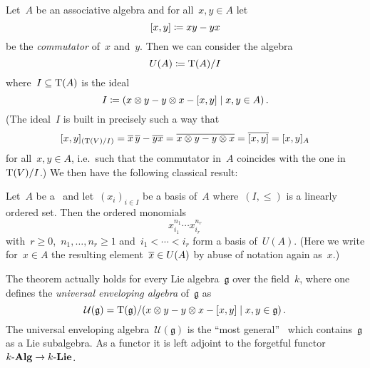 Let~$A$ be an associative algebra and for all~$x, y \in A$ let
\[
            [x,y]
  \coloneqq  xy - yx
\]
be the \emph{commutator} of~$x$ and~$y$.
Then we can consider the algebra
\[
            U(A)
  \coloneqq  \operatorname{T}(A)/I
\]
where~$I \subseteq \operatorname{T}(A)$ is the {\twosided} ideal
\[
            I
  \defined  \genideal{
              x \tensor y - y \tensor x - [x,y]
              \suchthat
              x, y \in A
            } \,.
\]
(The ideal~$I$ is built in precisely such a way that
\[
    [x, y]_{(\operatorname{T}(V)/I)}
  = \overline{x} \, \overline{y} - \overline{y} \overline{x}
  = \overline{x \otimes y - y \otimes x}
  = \overline{[x,y]}
  = [x,y]_A
\]
for all~$x, y \in A$, i.e.\ such that the commutator in~$A$ coincides with the one in~$\operatorname{T}(V)/I$.)
We then have the following classical result:

\begin{theorem}[{\pbw}]
  Let~$A$ be a~{\kalg} and let~$(x_i)_{i \in I}$ be a basis of~$A$ where~$(I, \leq)$ is a linearly ordered set.
  Then the ordered monomials
  \[
    x_{i_1}^{n_1} \dotsm x_{i_r}^{n_r}
  \]
  with~$r \geq 0$,~$n_1, \dotsc, n_r \geq 1$ and~$i_1 < \dotsb < i_r$ form a basis of~$U(A)$.
  (Here we write for~$x \in A$ the resulting element~$\overline{x} \in U(A)$ by abuse of notation again as~$x$.)
\end{theorem}

\begin{remark}
  The {\pbw} theorem actually holds for every Lie algebra~$\mathfrak{g}$ over the field~$k$, where one defines the \emph{universal enveloping algebra} of~$\mathfrak{g}$ as
  \[
      \mathcal{U}(\mathfrak{g})
    = \Tensor(\mathfrak{g})
      /
      \genideal{
        x \tensor y - y \tensor x - [x,y]
      \suchthat
        x, y \in \mathfrak{g}
      } \,.
  \]
  The universal enveloping algebra~$\mathcal{U}(\mathfrak{g})$ is the \enquote{most general}~{\kalg} which contains~$\mathfrak{g}$ as a Lie subalgebra.
  As a functor it is left adjoint to the forgetful functor~$\text{$k$-$\mathbf{Alg}$} \to \text{$k$-$\mathbf{Lie}$}$.
\end{remark}

